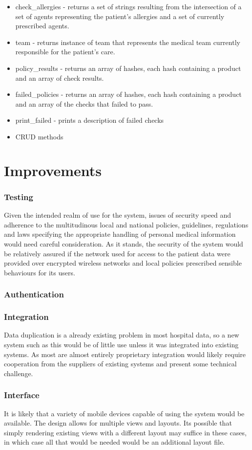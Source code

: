 \documentclass[letterpaper]{amsart}
\begin{document}
\begin{itemize}
    \item check\_allergies - returns a set of strings resulting from the intersection of a set of agents representing the patient's allergies and a set of currently prescribed agents.
    \item team - returns instance of team that represents the medical team currently responsible for the patient's care. 
    \item policy\_results - returns an array of hashes, each hash containing a product and an array of check results. 
    \item failed\_policies - returns an array of hashes, each hash containing a product and an array of the checks that failed to pass. 
    \item print\_failed - prints a description of failed checks 
    \item CRUD methods
\end{itemize}

\part{Improvements}
\section{Testing} 
Given the intended realm of use for the system, issues of security speed and adherence to the multitudinous local and national policies, guidelines, regulations and laws specifying the appropriate handling of personal medical information would need careful consideration.  As it stands, the security of the system would be relatively assured if the network used for access to the patient data were provided over encrypted wireless networks and local policies prescribed sensible behaviours for its users.
\section{Authentication}

\section{Integration}
Data duplication is a already existing problem in most hospital data, so a new system such as this would be of little use unless it was integrated into existing systems.  As most are almost entirely proprietary integration would likely require cooperation from the suppliers of existing systems and present some technical challenge.
\section{Interface}
It is likely that a variety of mobile devices capable of using the system would be available.  The design allows for multiple views and layouts.  Its possible that simply rendering existing views with a different layout may suffice in these cases, in which case all that would be needed would be an additional layout file.
\end{document}
